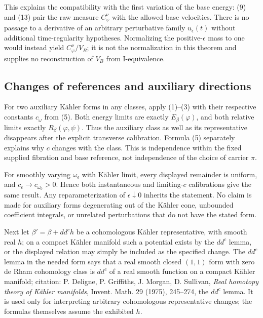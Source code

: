 \documentclass[
  11pt,
]{article}
\begin{document}
This explains the compatibility with the first variation of the base
energy: (9) and (13) pair the raw measure \(C_\varphi^\nu\) with the
allowed base velocities. There is no passage to a derivative of an
arbitrary perturbative family \(u_\epsilon(t)\) without additional
time-regularity hypotheses. Normalizing the positive-\(\epsilon\) mass
to one would instead yield \(C_\varphi^\nu/V_B\); it is not the
normalization in this theorem and supplies no reconstruction of \(V_B\)
from I-equivalence.

\subsection{Changes of references and auxiliary
directions}\label{changes-of-references-and-auxiliary-directions}

For two auxiliary Kähler forms in any classes, apply (1)--(3) with their
respective constants \(c_\omega\) from (5). Both energy limits are
exactly \(E_\beta(\varphi)\), and both relative limits exactly
\(R_\beta(\varphi,\psi)\). Thus the auxiliary class as well as its
representative disappears after the explicit transverse calibration.
Formula (5) separately explains why \(c\) changes with the class. This
is independence within the fixed supplied fibration and base reference,
not independence of the choice of carrier \(\pi\).

For smoothly varying \(\omega_\epsilon\) with Kähler limit, every
displayed remainder is uniform, and \(c_\epsilon\to c_{\omega_0}>0\).
Hence both instantaneous and limiting-\(c\) calibrations give the same
result. Any reparameterization of \(\epsilon\downarrow0\) inherits the
statement. No claim is made for auxiliary forms degenerating out of the
Kähler cone, unbounded coefficient integrals, or unrelated perturbations
that do not have the stated form.

Next let \(\beta'=\beta+dd^ch\) be a cohomologous Kähler representative,
with smooth real \(h\); on a compact Kähler manifold such a potential
exists by the \(dd^c\) lemma, or the displayed relation may simply be
included as the specified change. The \(dd^c\) lemma in the needed form
says that a real smooth closed \((1,1)\) form with zero de Rham
cohomology class is \(dd^c\) of a real smooth function on a compact
Kähler manifold; citation: P. Deligne, P. Griffiths, J. Morgan, D.
Sullivan, \emph{Real homotopy theory of Kähler manifolds}, Invent. Math.
29 (1975), 245--274, the \(dd^c\) lemma. It is used only for
interpreting arbitrary cohomologous representative changes; the formulas
themselves assume the exhibited \(h\).
\end{document}
